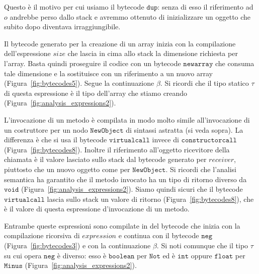 \begin{description}
  Questo \`e il motivo per cui usiamo il bytecode $\mathtt{dup}$:
  senza di esso il riferimento ad $o$ andrebbe perso dallo stack
  e avremmo ottenuto di inizializzare un oggetto che subito dopo
  diventava irraggiungibile.
\item[\underline{$\mathtt{NewArray(\mathit{elementsType},\mathit{size})}$}.]
  Il bytecode generato per la creazione di un array inizia con
  la compilazione dell'espressione $\mathit{size}$ che lascia in cima allo
  stack la dimensione richiesta per l'array.
  Basta quindi proseguire il codice con un bytecode $\mathtt{newarray}$ che
  consuma tale dimensione e la sostituisce con un riferimento a un nuovo
  array (Figura~\ref{fig:bytecodes5}). Segue la continuazione $\beta$.
  Si ricordi che il tipo statico $\tau$ di questa espressione \`e il tipo
  dell'array che stiamo creando (Figura~\ref{fig:analysis_expressions2}).
\item[\underline{$\mathtt{MethodCallExpression(\mathit{receiver},\mathit{name},
  \mathit{actuals})}$}.]
  L'invocazione di un metodo \`e compilata in modo molto simile all'invocazione
  di un costruttore per un nodo $\mathtt{NewObject}$ di sintassi astratta
  (si veda sopra). La differenza \`e che si usa il bytecode
  $\mathtt{virtualcall}$ invece di $\mathtt{constructorcall}$
  (Figura~\ref{fig:bytecodes8}). Inoltre il riferimento all'oggetto
  ricevitore della chiamata \`e il valore lasciato sullo stack dal
  bytecode generato per $\mathit{receiver}$, piuttosto che un nuovo oggetto
  come per $\mathtt{NewObject}$. Si ricordi che l'analisi semantica ha
  garantito che il metodo invocato ha un tipo di ritorno diverso da
  $\mathtt{void}$ (Figura~\ref{fig:analysis_expressions2}). Siamo quindi
  sicuri che il bytecode $\mathtt{virtualcall}$ lascia sullo stack un
  valore di ritorno (Figura~\ref{fig:bytecodes8}), che \`e il valore di
  questa espressione d'invocazione di un metodo.
\item[\underline{$\mathtt{Not(\mathit{expression})}$} e
  \underline{$\mathtt{Minus(\mathit{expression})}$}.]
  Entrambe queste espressioni sono compilate in del bytecode che
  inizia con la compilazione ricorsiva di $\mathit{expression}$ e continua
  con il bytecode $\mathtt{neg}$ (Figura~\ref{fig:bytecodes3})
  e con la continuazione $\beta$. Si noti comunque che il tipo $\tau$
  su cui opera $\mathtt{neg}$ \`e diverso: esso \`e $\mathtt{boolean}$
  per $\mathtt{Not}$ ed \`e $\mathtt{int}$ oppure $\mathtt{float}$ per
  $\mathtt{Minus}$ (Figura~\ref{fig:analysis_expressions2}).
\item[\underline{$\mathtt{Cast(\mathit{type},\mathit{expression})}$}.]

\end{description}
